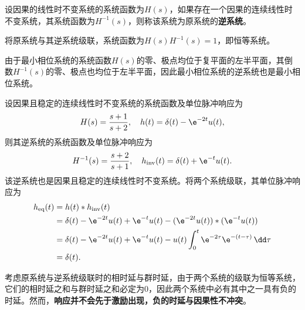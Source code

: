 \begin{definition}[逆系统]
    设因果的线性时不变系统的系统函数为$H(s)$，如果存在一个因果的连续线性时不变系统，其系统函数为$H^{-1}(s)$，则称该系统为原系统的\textbf{逆系统}。
\end{definition}

将原系统与其逆系统级联，系统函数为$H(s)H^{-1}(s)=1$，即恒等系统。

由于最小相位系统的系统函数$H(s)$的零、极点均位于复平面的左半平面，其倒数$H^{-1}(s)$的零、极点也均位于左半平面，因此最小相位系统的逆系统也是最小相位系统。

\begin{example}
    设因果且稳定的连续线性时不变系统的系统函数及单位脉冲响应为
    \begin{equation}
        H(s)=\frac{s+1}{s+2},\quad h(t)=\delta(t)-\e^{-2t}u(t),
    \end{equation}
    则其逆系统的系统函数及单位脉冲响应为
    \begin{equation}
        H^{-1}(s)=\frac{s+2}{s+1},\quad h_{\text{inv}}(t)=\delta(t)+\e^{-t}u(t).
    \end{equation}
    该逆系统也是因果且稳定的连续线性时不变系统。将两个系统级联，其单位脉冲响应为
    \begin{align}
        h_{\text{eq}}(t)&=h(t)*h_{\text{inv}}(t)\nonumber\\
        &=\delta(t)-\e^{-2t}u(t)+\e^{-t}u(t)-(\e^{-2t}u(t))*(\e^{-t}u(t))\nonumber\\
        &=\delta(t)-\e^{-2t}u(t)+\e^{-t}u(t)-u(t)\int_0^t \e^{-2\tau}\e^{-(t-\tau)}\,\dd\tau\nonumber\\
        &=\delta(t).
    \end{align}
\end{example}

考虑原系统与逆系统级联时的相时延与群时延，由于两个系统的级联为恒等系统，它们的相时延之和与群时延之和必定为$0$，因此两个系统中必有其中之一具有负的时延。然而，\textbf{响应并不会先于激励出现，负的时延与因果性不冲突}。


